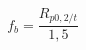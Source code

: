 \documentclass[12pt]{article}
\begin{document}
\begin{displaymath}
f_b = \frac {R_{p0,2/t} } {1,5}
\end{displaymath}
\end{document}
